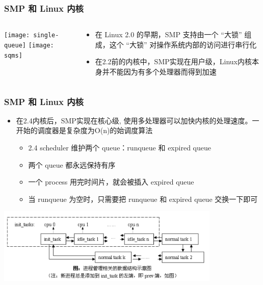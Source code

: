 \begin{frame}
	\frametitle{SMP 和 Linux 内核}
	\begin{columns}
	\begin{column}{.4\textwidth}
	\Large \centering
	
    \texttt{[image: single-queue]}
	\texttt{[image: sqms]}	
	\end{column}
	
	\begin{column}{.6\textwidth}
\begin{itemize}
	\item 在 Linux 2.0 的早期，SMP 支持由一个 “大锁” 组成，这个 “大锁” 对操作系统内部的访问进行串行化
	\item 在2.2前的内核中，SMP实现在用户级，Linux内核本身并不能因为有多个处理器而得到加速

	\end{itemize}

	\end{column}
\end{columns}
\end{frame}


\begin{frame}
	\frametitle{SMP 和 Linux 内核}
	
	\begin{itemize}
		
		\item 在2.4内核后，SMP实现在核心级, 使用多处理器可以加快内核的处理速度。一开始的调度器是复杂度为O(n)的始调度算法
		
		\begin{itemize}
			\item 2.4 scheduler 维护两个 queue：runqueue 和 expired queue
			\item 两个 queue 都永远保持有序
			\item 一个 process 用完时间片，就会被插入 expired queue
			\item 当 runqueue 为空时，只需要把 runqueue 和 expired queue 交换一下即可
		\end{itemize}
	\end{itemize}
	
	\includegraphics[width=0.8\textwidth,natwidth=1011,natheight=343]{figs/linux-2.4-sched.png}
	
	
\end{frame}

